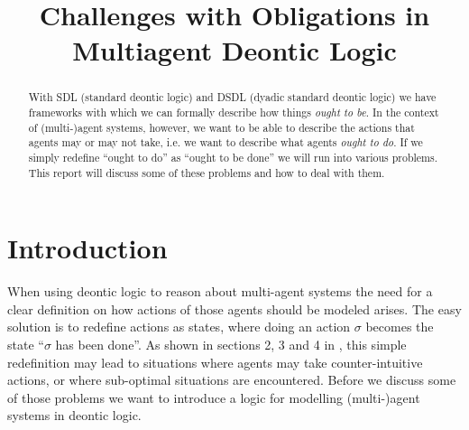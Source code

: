 \documentclass{article}
\title{Challenges with Obligations in Multiagent Deontic Logic}
\begin{document}
\maketitle
\begin{abstract}
	With SDL (standard deontic logic) and DSDL (dyadic standard deontic logic) we have frameworks with which we can formally describe how things \emph{ought to be}. In the context of (multi-)agent systems, however, we want to be able to describe the actions that agents may or may not take, i.e. we want to describe what agents \emph{ought to do}. If we simply redefine \enquote{ought to do} as \enquote{ought to be done} we will run into various problems. This report will discuss some of these problems and how to deal with them.
\end{abstract}

\section{Introduction}
When using deontic logic to reason about multi-agent systems the need for a clear definition on how actions of those agents should be modeled arises. The easy solution is to redefine actions as states, where doing an action $\sigma$ becomes the state \enquote{$\sigma$ has been done}. As shown in sections 2, 3 and 4 in \cite{mdl}, this simple redefinition may lead to situations where agents may take counter-intuitive actions, or where sub-optimal situations are encountered. Before we discuss some of those problems we want to introduce a logic for modelling (multi-)agent systems in deontic logic.
\end{document}
